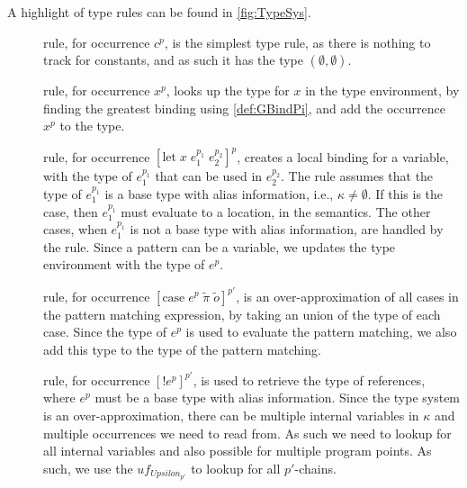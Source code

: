 \documentclass[acmsmall,sigplan]{acmart}
\begin{document}
A highlight of type rules can be found in \cref{fig:TypeSys}.

\begin{description}
	\item[] rule, for occurrence $c^p$, is the simplest type rule, as there is nothing to track for constants, and as such it has the type $(\emptyset,\emptyset)$.

	\item[] rule, for occurrence $x^p$, looks up the type for $x$ in the type environment, by finding the greatest binding using \cref{def:GBindPi}, and add the occurrence $x^p$ to the type.

	\item[] rule, for occurrence $[\mbox{let}\;x\;e_1^{p_1}\;e_2^{p_2}]^p$, creates a local binding for a variable, with the type of $e_1^{p_1}$ that can be used in $e_2^{p_2}$.
		The  rule assumes that the type of $e_1^{p_1}$ is a base type with alias information, i.e., $\kappa\neq\emptyset$.
		If this is the case, then $e_1^{p_1}$ must evaluate to a location, in the semantics.
		The other cases, when $e_1^{p_1}$ is not a base type with alias information, are handled by the  rule.
		Since a pattern can be a variable, we updates the type environment with the type of $e^p$.

	\item[] rule, for occurrence $[\mbox{case}\;e^{p}\;\tilde{\pi}\;\tilde{o}]^{p'}$, is an over-approximation of all cases in the pattern matching expression, by taking an union of the type of each case.
		Since the type of $e^p$ is used to evaluate the pattern matching, we also add this type to the type of the pattern matching.

	\item[] rule, for occurrence $[!e^{p}]^{p'}$, is used to retrieve the type of references, where $e^p$ must be a base type with alias information.
		Since the type system is an over-approximation, there can be multiple internal variables in $\kappa$ and multiple occurrences we need to read from.
		As such we need to lookup for all internal variables and also possible for multiple program points.
		As such, we use the $uf_{Upsilon_{p'}}$ to lookup for all $p'$-chains.
\end{description}

\end{document}
